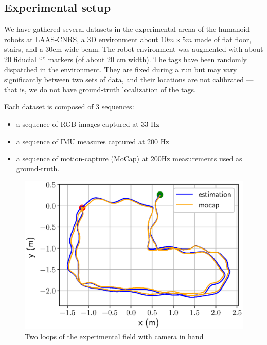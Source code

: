 \subsection{Experimental setup}
We have gathered several datasets in the experimental arena of the humanoid robots at LAAS-CNRS, a 3D environment about $10m \times 5m$ made of flat floor, 
stairs, and a 30cm wide beam.
The robot environment was augmented with about 20 fiducial ``\apriltag'' markers (of about 20 cm width).
The tags have been randomly dispatched in the environment.
They are fixed during a run but may vary significantly between two sets of data, and their locations are not calibrated ---that is, we do not have ground-truth localization of the tags.

Each dataset is composed of 3 sequences:
\begin{itemize}
    \item a sequence of RGB images captured at 33 Hz
    \item a sequence of IMU measures captured at 200 Hz
    \item a sequence of motion-capture (MoCap) at 200Hz measurements used as ground-truth.
\end{itemize}


\begin{figure}[t]
    \centering
    \includegraphics[scale=0.8]{figures/absolute/xy_loop_twice.eps}
    \caption{Two loops of the experimental field with camera in hand}
    \label{fig:xy_loop_twice}
\end{figure}

